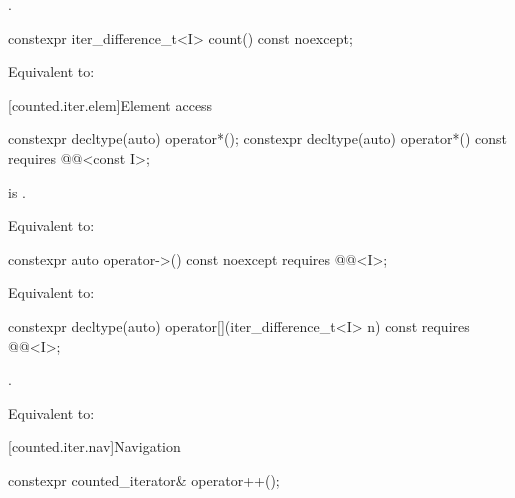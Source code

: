 \begin{itemdescr}
\pnum
\returns
{}.
\end{itemdescr}

%
\begin{itemdecl}
constexpr iter_difference_t<I> count() const noexcept;
\end{itemdecl}

\begin{itemdescr}
\pnum
\effects
Equivalent to: 
\end{itemdescr}

[counted.iter.elem]{Element access}

%
\begin{itemdecl}
constexpr decltype(auto) operator*();
constexpr decltype(auto) operator*() const
  requires @@<const I>;
\end{itemdecl}

\begin{itemdescr}
\pnum
\expects
{} is .

\pnum
\effects
Equivalent to: 
\end{itemdescr}

%
\begin{itemdecl}
constexpr auto operator->() const noexcept
  requires @@<I>;
\end{itemdecl}

\begin{itemdescr}
\pnum
\effects
Equivalent to: 
\end{itemdescr}

%
\begin{itemdecl}
constexpr decltype(auto) operator[](iter_difference_t<I> n) const
  requires @@<I>;
\end{itemdecl}

\begin{itemdescr}
\pnum
\expects
{}.

\pnum
\effects
Equivalent to: 
\end{itemdescr}

[counted.iter.nav]{Navigation}

%
\begin{itemdecl}
constexpr counted_iterator& operator++();
\end{itemdecl}

